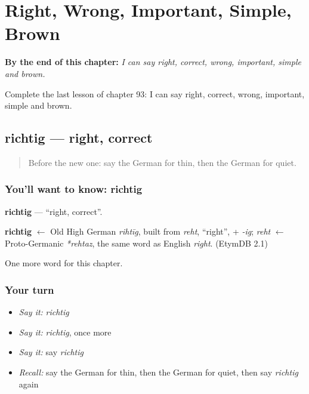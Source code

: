 
\chapter{Right, Wrong, Important, Simple, Brown}
\label{ch:ge-right-wrong-important-simple-brown}

\begin{chapteropening}
\textbf{By the end of this chapter:} \emph{I can say right, correct, wrong, important, simple and brown.}

Complete the last lesson of chapter 93: I can say right, correct, wrong, important, simple and brown.
\end{chapteropening}

\section[richtig]{richtig — right, correct}

\label{lesson:GE-C93-richtig}



\begin{quote}
Before the new one: say the German for thin, then the German for quiet.
\end{quote}

\subsection*{You'll want to know: richtig}
\textbf{richtig} — \textquotedblleft{}right, correct\textquotedblright{}.

\begin{cousinweb}
\textbf{richtig} $\leftarrow$ Old High German \emph{rihtīg}, built from \emph{reht}, \textquotedblleft{}right\textquotedblright{}, + \emph{-ig}; \emph{reht} $\leftarrow$ Proto-Germanic \emph{*rehtaz}, the same word as English \emph{right}. (EtymDB 2.1)
\end{cousinweb}

\begin{grammarlens}[title={What you've built}]
One more word for this chapter.
\end{grammarlens}

\subsection*{Your turn}
\begin{itemize}
\raggedright
  \item \emph{Say it:} \emph{richtig}
  \item \emph{Say it:} \emph{richtig}, once more
  \item \emph{Say it:} say \emph{richtig}
  \item \emph{Recall:} say the German for thin, then the German for quiet, then say \emph{richtig} again
\end{itemize}

